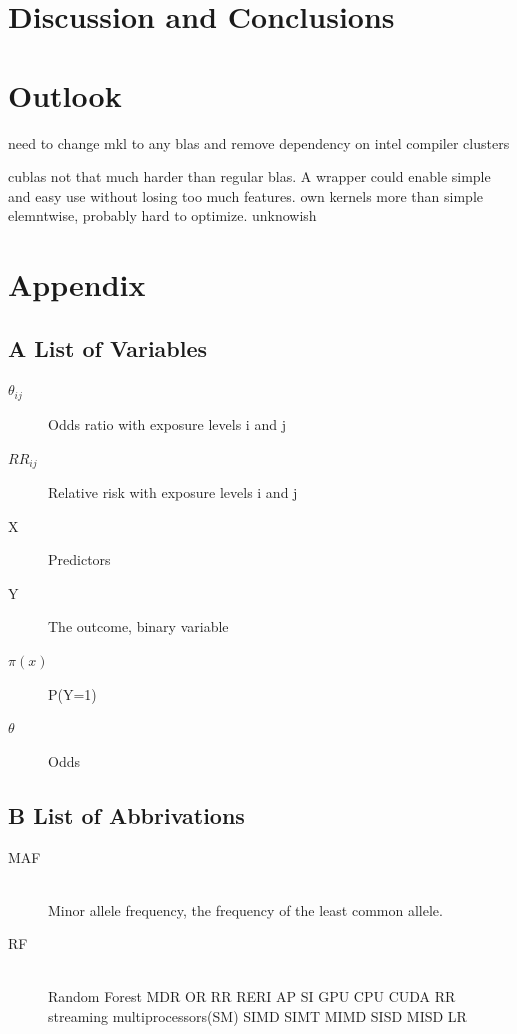 \documentclass[10pt,a4paper]{report}
\begin{document}

\chapter{Discussion and Conclusions}

\chapter{Outlook}

need to change mkl to any blas and remove dependency on intel compiler
clusters

cublas not that much harder than regular blas. A wrapper could enable simple and easy use without losing too much features.
own kernels more than simple elemntwise, probably hard to optimize. unknowish

\chapter{Appendix}
\section{A List of Variables}

\begin{description}
\item[$\theta_{ij}$]
  Odds ratio with exposure levels i and j
\item[$RR_{ij}$]
  Relative risk with exposure levels i and j
\item[X]
  Predictors
\item[Y]
  The outcome, binary variable
\item[$\pi(x)$]
  P(Y=1)
\item[$\theta$]
  Odds
\end{description}

\section{B List of Abbrivations}

\begin{description}
\item[MAF] \hfill \\
  Minor allele frequency, the frequency of the least common allele.
\item[RF] \hfill \\
  Random Forest
  MDR
  OR
  RR
  RERI
  AP
  SI
  GPU
  CPU
  CUDA
  RR
  streaming multiprocessors(SM)
  SIMD
  SIMT
  MIMD
  SISD
  MISD
  LR
\end{description}



\newpage


\end{document}
